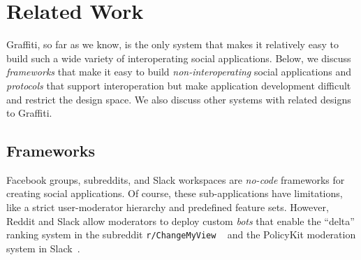 \section{Related Work}
\label{related-work}

Graffiti, so far as we know, is the only system that makes it
relatively easy to build such a wide variety of interoperating social applications.
Below, we discuss \emph{frameworks} that make it easy to build
\emph{non-\allowbreak{}interoperating} social applications
and \emph{protocols} that support interoperation but
make application development difficult and restrict the design space.
We also discuss other systems with related designs to Graffiti.


\subsection{Frameworks}

Facebook groups, subreddits, and
Slack workspaces are \emph{no-code} frameworks for creating social
applications.
Of course, these sub-applications have limitations,
like a strict user-moderator hierarchy
and predefined feature sets.
However, Reddit and Slack allow moderators to deploy
custom \emph{bots} that enable the
``delta'' ranking system in the subreddit \texttt{r/Change\allowbreak{}My\allowbreak{}View}
~\cite{changemyview}
and the PolicyKit moderation system in Slack~\cite{policykit}.

